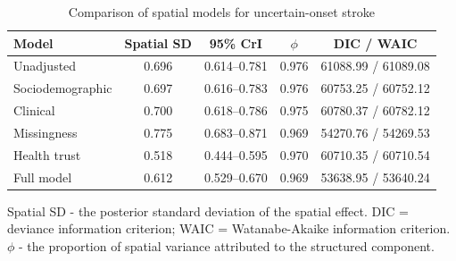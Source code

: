 \begin{table}[htbp]
  \caption{Comparison of spatial models for uncertain-onset stroke}
  \label{tab:spatial_models}
  \small
  \begin{threeparttable}

    \begin{tabularx}{\textwidth}{@{}Xcccc@{}}
      \toprule
      \textbf{Model}      &
      \textbf{Spatial SD} &
      \textbf{95\% CrI}   &
      \boldmath$\phi$     &
      \textbf{DIC / WAIC}                                                      \\
      \midrule

      Unadjusted          & 0.696 & 0.614--0.781 & 0.976 & 61088.99 / 61089.08 \\

      Sociodemographic    & 0.697 & 0.616--0.783 & 0.976 & 60753.25 / 60752.12 \\

      Clinical            & 0.700 & 0.618--0.786 & 0.975 & 60780.37 / 60782.12 \\

      Missingness         & 0.775 & 0.683--0.871 & 0.969 & 54270.76 / 54269.53 \\

      Health trust        & 0.518 & 0.444--0.595 & 0.970 & 60710.35 / 60710.54 \\

      Full model          & 0.612 & 0.529--0.670 & 0.969 & 53638.95 / 53640.24 \\

      \bottomrule
    \end{tabularx}

    \begin{tablenotes}
      \footnotesize
      \item Spatial SD - the posterior standard deviation of the spatial effect. DIC =
      deviance information criterion; WAIC = Watanabe-Akaike information criterion.
      $\phi$ - the proportion of spatial variance attributed to the structured
      component.
    \end{tablenotes}

  \end{threeparttable}
\end{table}